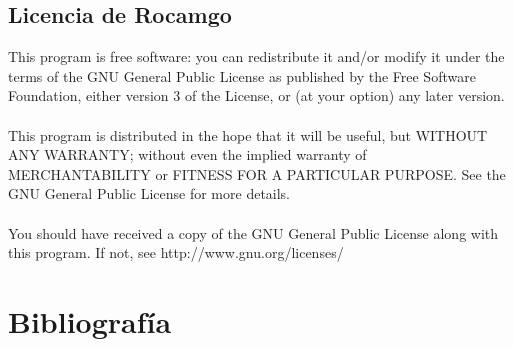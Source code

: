 \documentclass[12pt,a4paper]{report}
\begin{document}
\section{Licencia de Rocamgo}

This program is free software: you can redistribute it and/or modify it under the terms of the GNU General Public License as published by the Free Software Foundation, either version 3 of the License, or (at your option) any later version. \\
\\
This program is distributed in the hope that it will be useful, but WITHOUT ANY WARRANTY; without even the implied warranty of MERCHANTABILITY or FITNESS FOR A PARTICULAR PURPOSE.  See the GNU General Public License for more details. \\
\\
You should have received a copy of the GNU General Public License along with this program.  If not, see http://www.gnu.org/licenses/



\chapter{Bibliografía}
\end{document}

